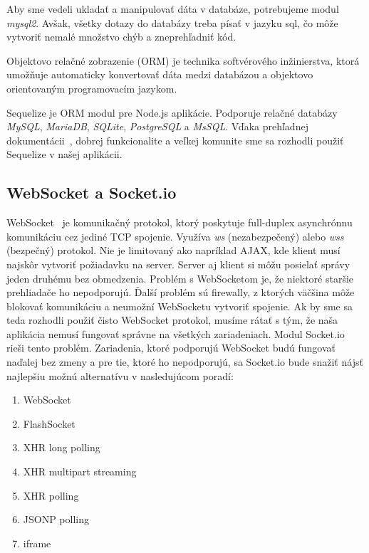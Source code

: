 Aby sme vedeli ukladať a manipulovať dáta v databáze, potrebujeme modul \textit{mysql2}.
Avšak, všetky dotazy do databázy treba písať v jazyku sql, čo môže vytvoriť nemalé
množstvo chýb a zneprehľadniť kód.

Objektovo relačné zobrazenie (ORM) je technika
softvérového inžinierstva, ktorá umožňuje automaticky
konvertovať dáta medzi databázou a objektovo orientovaným programovacím jazykom.
~\cite{bib:orm}

Sequelize je ORM modul pre Node.js aplikácie. Podporuje relačné databázy \textit{MySQL},
\textit{MariaDB}, \textit{SQLite}, \textit{PostgreSQL} a \textit{MsSQL}.
Vďaka prehľadnej dokumentácii~\cite{bib:sequelizedocs}, dobrej funkcionalite a veľkej
komunite sme sa rozhodli použiť Sequelize v našej aplikácii.

\subsection{WebSocket a Socket.io}
\label{sec:nodejs:socketio}

WebSocket~\cite{bib:fette2011websocket} je komunikačný protokol, ktorý poskytuje full-duplex asynchrónnu komunikáciu cez
jediné TCP spojenie. Využíva \textit{ws} (nezabezpečený) alebo \textit{wss} (bezpečný)
protokol. Nie je limitovaný ako napríklad AJAX, kde klient musí najskôr vytvoriť
požiadavku na server. Server aj klient si môžu posielať správy jeden druhému bez
obmedzenia. Problém s WebSocketom je, že niektoré staršie prehliadače ho nepodporujú.
Ďalší problém sú firewally, z ktorých väčšina môže blokovať komunikáciu a neumožní
WebSocketu vytvoriť spojenie. Ak by sme sa teda rozhodli použiť čisto WebSocket
protokol, musíme rátať s tým, že naša aplikácia nemusí fungovať správne na všetkých
zariadeniach. Modul Socket.io rieši tento problém. Zariadenia, ktoré
podporujú WebSocket budú fungovať naďalej bez zmeny a pre tie, ktoré ho
nepodporujú, sa Socket.io bude snažiť nájsť najlepšiu možnú alternatívu v
nasledujúcom poradí:
\begin{enumerate}
	\item WebSocket
	\item FlashSocket
	\item XHR long polling
	\item XHR multipart streaming
	\item XHR polling
	\item JSONP polling
	\item iframe
\end{enumerate}

